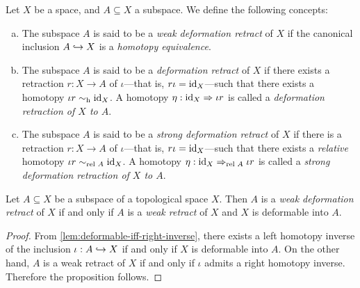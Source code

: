 \begin{definition}
    \label{def:deformation-retract}
    Let \(X\) be a space, and \(A \subseteq X\) a subspace. We define the following
    concepts:
    \begin{enumerate}[(a)]\setlength\itemsep{0em}
        \item The subspace \(A\) is said to be a \emph{weak deformation
                  retract} of \(X\) if the canonical inclusion \(A \hookrightarrow X\) is a
              \emph{homotopy equivalence}.

        \item The subspace \(A\) is said to be a \emph{deformation retract} of \(X\) if
              there exists a retraction \(r: X \to A\) of \(\iota\)---that is,
              \(r \iota = \operatorname{id}_X\)---such that there exists a homotopy
              \(\iota r \sim_{\text{h}} \operatorname{id}_X\). A homotopy \(\eta: \operatorname{id}_X \Rightarrow \iota r\) is called a
              \emph{deformation retraction of \(X\) to \(A\)}.

        \item The subspace \(A\) is said to be a \emph{strong deformation retract} of
              \(X\) if there is a retraction \(r: X \to A\) of \(\iota\)---that is,
              \(r \iota = \operatorname{id}_X\)---such that there exists a \emph{relative} homotopy
              \(\iota r \sim_{\text{rel }{A}} \operatorname{id}_X\). A homotopy \(\eta: \operatorname{id}_X \Rightarrow_{\text{rel }{A}} \iota r\)
              is called a \emph{strong deformation retraction of \(X\) to \(A\)}.
    \end{enumerate}
\end{definition}

\begin{lemma}
    \label{lem:weak-deformation-retract-iff-weak-retract-and-deformable}
    Let \(A \subseteq X\) be a subspace of a topological space \(X\). Then \(A\) is
    a \emph{weak deformation retract} of \(X\) if and only if \(A\) is a \emph{weak
        retract} of \(X\) and \(X\) is deformable into \(A\).
\end{lemma}

\begin{proof}
    From \cref{lem:deformable-iff-right-inverse}, there exists a left homotopy
    inverse of the inclusion \(\iota: A \hookrightarrow X\) if and only if \(X\) is deformable
    into \(A\). On the other hand, \(A\) is a weak retract of \(X\) if and only if
    \(\iota\) admits a right homotopy inverse. Therefore the proposition follows.
\end{proof}

